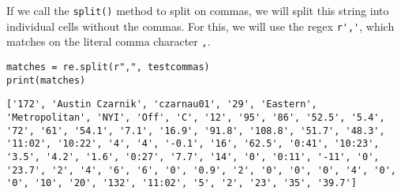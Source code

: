 If we call the \verb|split()| method to split on commas, we will split this string into individual cells without the commas. For this, we will use the regex \verb|r','|, which matches on the literal comma character \verb|,|.\par
\begin{lstlisting}[style=pippython]
matches = re.split(r",", testcommas)
print(matches)
\end{lstlisting}
\begin{lstlisting}[style=none]
['172', 'Austin Czarnik', 'czarnau01', '29', 'Eastern', 'Metropolitan', 'NYI', 'Off', 'C', '12', '95', '86', '52.5', '5.4', '72', '61', '54.1', '7.1', '16.9', '91.8', '108.8', '51.7', '48.3', '11:02', '10:22', '4', '4', '-0.1', '16', '62.5', '0:41', '10:23', '3.5', '4.2', '1.6', '0:27', '7.7', '14', '0', '0:11', '-11', '0', '23.7', '2', '4', '6', '6', '0', '0.9', '2', '0', '0', '0', '4', '0', '0', '10', '20', '132', '11:02', '5', '2', '23', '35', '39.7']
\end{lstlisting}

